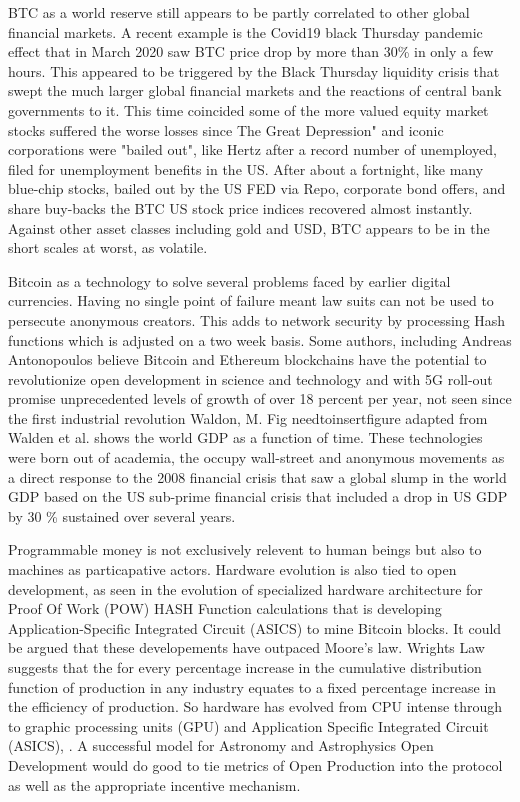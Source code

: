 \documentclass[final,5p,times,twocolumn,authoryear]{elsarticle}
\begin{document}
BTC as a world reserve still appears to be partly correlated to other global financial markets. A recent example is the Covid19 black Thursday pandemic effect that in March 2020 saw BTC price drop by more than 30\% in only a few hours. This appeared to be triggered by the Black Thursday liquidity crisis that swept the much larger global financial markets and the reactions of central bank governments to it. This time coincided some of the more valued equity market stocks suffered the worse losses since The Great Depression" and iconic corporations were "bailed out", like Hertz after a record number of unemployed, filed for unemployment benefits in the US. After about a fortnight, like many blue-chip stocks, bailed out by the US FED via Repo, corporate bond offers, and share buy-backs the BTC US stock price indices recovered almost instantly. Against other asset classes including gold and USD, BTC appears to be in the short scales at worst, as volatile. 
 
 
Bitcoin as a technology to solve several problems faced by earlier digital currencies. Having no single point of failure meant law suits can not be used to persecute anonymous creators. This adds to network security by processing Hash functions which is adjusted on a two week basis. Some authors, including Andreas Antonopoulos believe Bitcoin and Ethereum blockchains have the potential to revolutionize open development in science and technology and with 5G roll-out promise unprecedented levels of growth of over 18 percent per year, not seen since the first industrial revolution Waldon, M.  Fig needtoinsertfigure adapted from Walden et al. shows the world GDP as a function of time. These technologies were born out of academia, the occupy wall-street and anonymous movements as a direct response to the 2008 financial crisis that saw a global slump in the world GDP based on the US sub-prime financial crisis  that included a drop in US GDP by 30 \% sustained over several years.
 
Programmable money is not exclusively relevent to human beings but also to machines as particapative actors. Hardware evolution is also tied to open development, as seen in the evolution of specialized hardware architecture for Proof Of Work (POW) HASH Function calculations that is developing Application-Specific Integrated Circuit (ASICS) to mine Bitcoin blocks. It could be argued that these developements have outpaced Moore's law.  Wrights Law suggests that the for every percentage increase in the cumulative distribution function of production in any industry equates to a fixed percentage increase in the efficiency of production. So hardware has evolved from CPU intense through to graphic processing units (GPU) and  Application Specific Integrated Circuit  (ASICS), \cite{10.1371/journal.pone.0052669}. A successful model for Astronomy and Astrophysics Open Development would do good to tie metrics of Open Production into the protocol as well as the appropriate incentive mechanism.       
\end{document}

